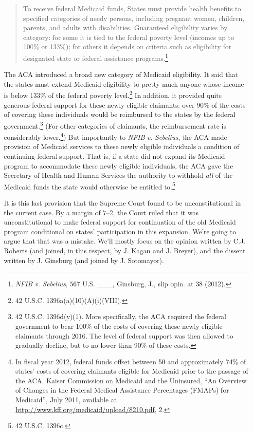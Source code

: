 \documentclass[
  10pt,
  letterpaper,
  DIV=11,
  numbers=noendperiod,
  twoside]{scrartcl}
\begin{document}
\begin{quote}
To receive federal Medicaid funds, States must provide health benefits
to specified categories of needy persons, including pregnant women,
children, parents, and adults with disabilities. Guaranteed eligibility
varies by category: for some it is tied to the federal poverty level
(incomes up to 100\% or 133\%); for others it depends on criteria such
as eligibility for designated state or federal assistance
programs.\footnote{\emph{NFIB v. Sebelius}, 567 U.S. \_\_\_, Ginsburg,
  J., slip opin. at 38 (2012).}
\end{quote}

The ACA introduced a broad new category of Medicaid eligibility. It said
that the states must extend Medicaid eligibility to pretty much anyone
whose income is below 133\% of the federal poverty level.\footnote{42
  U.S.C. 1396a(a)(10)(A)(i)(VIII).} In addition, it provided quite
generous federal support for these newly eligible claimants: over 90\%
of the costs of covering these individuals would be reimbursed to the
states by the federal government.\footnote{42 U.S.C. 1396d(y)(1). More
  specifically, the ACA required the federal government to bear 100\% of
  the costs of covering these newly eligible claimants through 2016. The
  level of federal support was then allowed to gradually decline, but to
  no lower than 90\% of these costs.} (For other categories of
claimants, the reimbursement rate is considerably lower.\footnote{In
  fiscal year 2012, federal funds offset between 50 and approximately
  74\% of states' costs of covering claimants eligible for Medicaid
  prior to the passage of the ACA. Kaiser Commission on Medicaid and the
  Uninsured, ``An Overview of Changes in the Federal Medical Assistance
  Percentages (FMAPs) for Medicaid'', July 2011, available at
  \url{http://www.kff.org/medicaid/upload/8210.pdf}, 2.}) But
importantly to \emph{NFIB v. Sebelius}, the ACA made provision of
Medicaid services to these newly eligible individuals a condition of
continuing federal support. That is, if a state did not expand its
Medicaid program to accommodate these newly eligible individuals, the
ACA gave the Secretary of Health and Human Services the authority to
withhold \emph{all} of the Medicaid funds the state would otherwise be
entitled to.\footnote{42 U.S.C. 1396c.}

It is this last provision that the Supreme Court found to be
unconstitutional in the current case. By a margin of 7--2, the Court
ruled that it was unconstitutional to make federal support for
continuation of the old Medicaid program conditional on states'
participation in this expansion. We're going to argue that that was a
mistake. We'll mostly focus on the opinion written by C.J. Roberts (and
joined, in this respect, by J. Kagan and J. Breyer), and the dissent
written by J. Ginsburg (and joined by J. Sotomayor).
\end{document}
